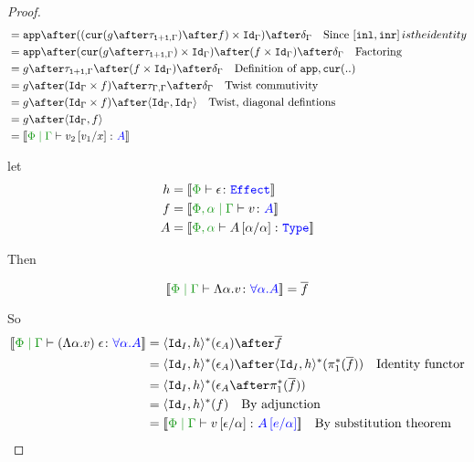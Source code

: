 \documentclass{report}
\begin{document}
\begin{framed}
\begin{proof}
\begin{align*}
                & = \app\after((\cur{g\after\twist{\1+\1}{\G}}\after f)\times \idg)\after\diag{\G}\qt{Since $\fld{\inl}{\inr} is the identity$}\\
                & = \app\after(\cur{g\after\twist{\1+\1}{\G}}\times \idg)\after (f\times \idg)\after\diag{\G}\qt{Factoring}\\
               & = g\after\twist{\1+\1}{\G} \after (f\times \idg)\after\diag{\G} \qt{Definition of $\app,\cur{..}$}\\
               & = g\after(\idg\times f)\after \twist{\G}{\G} \after\diag{\G} \qt{Twist commutivity}\\
               & = g\after(\idg\times f) \after\pr{\idg}{\idg} \qt{Twist, diagonal defintions} \\
               & = g\after\pr{\idg}{f} \\
               & = \deno{\gpetyperelation{v_2\ssub{x}{v_1}}{A}} \\
            \end{align*}
        
            let 
            \begin{align*}
                h & = \deno{\typerelation{\P}{\e}{\effect}}
                \\
                f & = \deno{\etyperelation{\P,\a}{\G}{v}{A}}
                \\
                A &= \deno{\typerelation{\P,\a}{A\ssub{\a}{\a}}{\type}}
            \end{align*}
        
            Then
        
            \begin{equation}
                \deno{\gpetyperelation{\elam{\a}{v}}{\all{\a}{A}}} = \bar{f}\\
            \end{equation}
        
            So
            \begin{align*}
                \deno{\gpetyperelation{\eapp{(\elam{\a}{v})}{\e}}{\all{\a}{A}}} & = \pr{\Id{I}}{h}\star(\e_A)\after\bar{f}\\
                & = \pr{\Id{I}}{h}\star(\e_A)\after\pr{\Id{I}}{h}\star(\pstar(\bar{f}))\qt{Identity functor}\\
                &= \pr{\Id{I}}{h}\star(\e_A\after\pstar(\bar{f}))\\
                &= \pr{\Id{I}}{h}\star(f)\qt{By adjunction}\\
                &= \deno{\gpetyperelation{v\ssub{\a}{\e}}{A\ssub{\a}{e}}}\qt{By substitution theorem}\\
            \end{align*}
        

\end{proof}
\end{framed}
\end{document}
